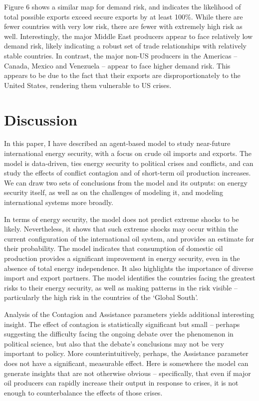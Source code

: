 \documentclass{llncs}
\begin{document}
Figure 6 shows a similar map for demand risk, and indicates the likelihood of total possible exports exceed secure exports by at least 100\%. While there are fewer countries with very low risk, there are fewer with extremely high risk as well. Interestingly, the major Middle East producers appear to face relatively low demand risk, likely indicating a robust set of trade relationships with relatively stable countries. In contrast, the major non-US producers in the Americas -- Canada, Mexico and Venezuela -- appear to face higher demand risk. This appears to be due to the fact that their exports are disproportionately to the United States, rendering them vulnerable to US crises.


\section{Discussion}

In this paper, I have described an agent-based model to study near-future international energy security, with a focus on crude oil imports and exports. The model is data-driven, ties energy security to political crises and conflicts, and can study the effects of conflict contagion and of short-term oil production increases. We can draw two sets of conclusions from the model and its outputs: on energy security itself, as well as on the challenges of modeling it, and modeling international systems more broadly.

In terms of energy security, the model does not predict extreme shocks to be likely. Nevertheless, it shows that such extreme shocks may occur within the current configuration of the international oil system, and provides an estimate for their probability. The model indicates that consumption of domestic oil production provides a significant improvement in energy security, even in the absence of total energy independence. It also highlights the importance of diverse import and export partners. The model identifies the countries facing the greatest risks to their energy security, as well as making patterns in the risk visible -- particularly the high risk in the countries of the `Global South'. 

Analysis of the Contagion and Assistance parameters yields additional interesting insight. The effect of contagion is statistically significant but small -- perhaps suggesting the difficulty facing the ongoing debate over the phenomenon in political science, but also that the debate's conclusions may not be very important to policy. More counterintuitively, perhaps, the Assistance parameter does not have a significant, measurable effect. Here is somewhere the model can generate insights that are not otherwise obvious -- specifically, that even if major oil producers can rapidly increase their output in response to crises, it is not enough to counterbalance the effects of those crises. 
\end{document}
